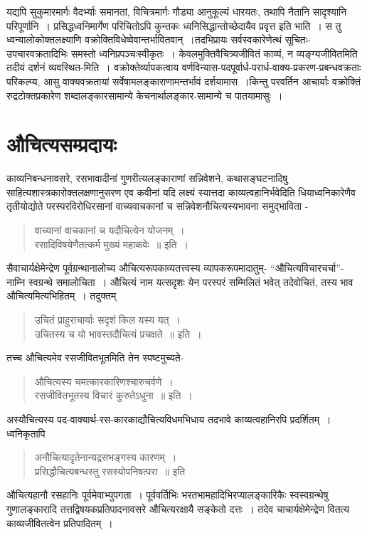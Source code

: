 {यद्यपि सुकुमारमार्गः वैदर्भ्याः समानतां, विचित्रमार्गः गौड्या आनुकूल्यं धारयतः, तथापि नैतानि सादृश्यानि परिपूर्णानि~। प्रसिद्धध्वनिमार्गेण परिचितोऽपि कुन्तकः ध्वनिसिद्धान्तोच्छे\-दायैव प्रवृत्त इति भाति~। स तु ध्वन्यालोकोक्तलक्ष्याणि वक्रोक्तिविधेष्वेवान्तर्भावितवान्~।\break तदभिप्रायः सर्वस्वकारेणेत्थं सूचितः- उपचारवक्रतादिभिः समस्तो ध्वनिप्रपञ्चः\break स्वीकृतः~। केवलमुक्तिवैचित्र्यजीवितं काव्यं, न व्यङ्ग्यजीवितमिति तदीयं दर्शनं व्यवस्थित-मिति~। वक्रोक्तेर्व्यापकत्वाय वर्णविन्यास-पदपूर्वार्ध-परार्ध-वाक्य-प्रकरण-\break प्रबन्धवक्रताः परिकल्प्य, आसु वाक्यवक्रतायां सर्वेषामलङ्काराणामन्तर्भावं दर्शयामास~।\break किन्तु परवर्तिन आचार्याः वक्रोक्तिं रुद्रटोक्तप्रकारेण शब्दालङ्कारसामान्ये केचनार्थालङ्कार-\break सामान्ये च पातयामासुः~। 

\section*{ औचित्यसम्प्रदायः} 

काव्यनिबन्धनावसरे, रसभावादीनां गुणरीत्यलङ्काराणां सन्निवेशने, कथासङ्घटनादिषु साहित्य\-शास्त्रकारोक्तलक्षणानुसरण एव कवीनां यदि लक्ष्यं स्यात्तदा काव्यत्वहानिर्भवेदिति धिया\break ध्वनिकारेणैव तृतीयोद्योते परस्परविरोधिरसानां वाच्यवाचकानां च सन्निवेशनौचित्यस्य\break भावना समुद्भाविता - 
\begin{verse}
वाच्यानां वाचकानां च यदौचित्येन योजनम्~। \\
रसादिविषयेणैतत्कर्म मुख्यं महाकवेः~॥ इति~। 
\end{verse}

सैवाचार्यक्षेमेन्द्रेण पूर्वग्रन्थानालोच्य औचित्यरूपकाव्यतत्त्वस्य व्यापकरूपमादातुम्- “औचित्यविचारचर्चा”- नाम्नि स्वग्रन्थे समालोचिता~। औचित्यं नाम यत्सदृशः येन परस्परं सम्मिलितं भवेत् तदेवोचितं, तस्य भाव औचित्यमित्यभिहितम्~। तदुक्तम्

\begin{verse}
उचितं प्राहुराचार्याः सदृशं किल यस्य यत्~। \\
उचितस्य च यो भावस्तदौचित्यं प्रचक्षते~॥ इति~। 
\end{verse} 
तच्च औचित्यमेव रसजीवितभूतमिति तेन स्पष्टमुच्यते-
\begin{verse}
औचित्यस्य चमत्कारकारिणश्चारुचर्वणे~। \\
रसजीवितभूतस्य विचारं कुरुतेऽधुना~॥ इति~। 
\end{verse}
अस्यौचित्यस्य पद-वाक्यार्थ-रस-कारकाद्यौचित्यविधमभिधाय तदभावे काव्यत्वहानिरपि प्रदर्शितम्~। ध्वनिकृतापि
\begin{verse}
अनौचित्यादृतेनान्यद्रसभङ्गस्य कारणम्~। \\
प्रसिद्धौचित्यबन्धस्तु रसस्योपनिषत्परा~॥ इति 
\end{verse}
औचित्यहानौ रसहानिः पूर्वमेवाभ्युपगता~। पूर्ववर्तिभिः भरतभामहादिभिरप्यालङ्कारिकैः स्वस्वग्रन्थेषु गुणालङ्कारादि तत्तद्विषयकप्रतिपादनावसरे औचित्यरक्षायै सङ्केतो दत्तः~। तदेव चाचार्यक्षेमेन्द्रेण वितत्य काव्यजीवितत्वेन प्रतिपादितम्~। 

}
